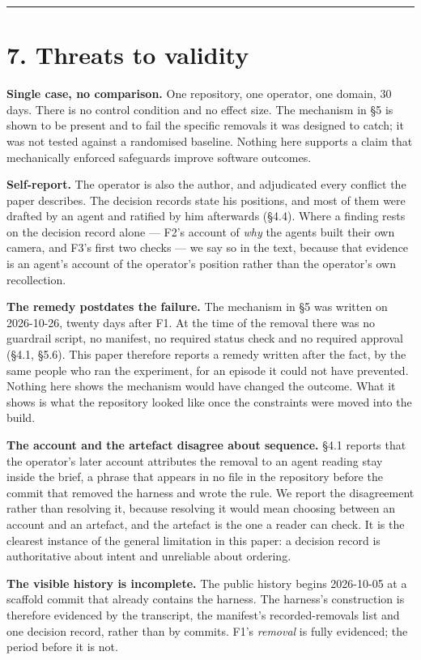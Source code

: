 \documentclass[11pt,a4paper]{article}
\begin{document}
\medskip\hrule\medskip

\section*{7. Threats to validity}

\textbf{Single case, no comparison.} One repository, one operator, one domain, 30 days. There is no control condition and no effect size. The mechanism in \S{}5 is shown to be present and to fail the specific removals it was designed to catch; it was not tested against a randomised baseline. Nothing here supports a claim that mechanically enforced safeguards improve software outcomes.

\textbf{Self-report.} The operator is also the author, and adjudicated every conflict the paper describes. The decision records state his positions, and most of them were drafted by an agent and ratified by him afterwards (\S{}4.4). Where a finding rests on the decision record alone --- F2's account of \emph{why} the agents built their own camera, and F3's first two checks --- we say so in the text, because that evidence is an agent's account of the operator's position rather than the operator's own recollection.

\textbf{The remedy postdates the failure.} The mechanism in \S{}5 was written on 2026-10-26, twenty days after F1. At the time of the removal there was no guardrail script, no manifest, no required status check and no required approval (\S{}4.1, \S{}5.6). This paper therefore reports a remedy written after the fact, by the same people who ran the experiment, for an episode it could not have prevented. Nothing here shows the mechanism would have changed the outcome. What it shows is what the repository looked like once the constraints were moved into the build.

\textbf{The account and the artefact disagree about sequence.} \S{}4.1 reports that the operator's later account attributes the removal to an agent reading \textquotedbl{}stay inside the brief\textquotedbl{}, a phrase that appears in no file in the repository before the commit that removed the harness and wrote the rule. We report the disagreement rather than resolving it, because resolving it would mean choosing between an account and an artefact, and the artefact is the one a reader can check. It is the clearest instance of the general limitation in this paper: a decision record is authoritative about intent and unreliable about ordering.

\textbf{The visible history is incomplete.} The public history begins 2026-10-05 at a scaffold commit that already contains the harness. The harness's construction is therefore evidenced by the transcript, the manifest's recorded-removals list and one decision record, rather than by commits. F1's \emph{removal} is fully evidenced; the period before it is not.
\end{document}
